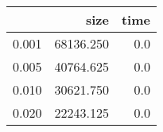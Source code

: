 \begin{table}[H]
\centering
\begin{tabular}{lrr}
\toprule
{} &       size &  time \\
\midrule
0.001 &  68136.250 &   0.0 \\
0.005 &  40764.625 &   0.0 \\
0.010 &  30621.750 &   0.0 \\
0.020 &  22243.125 &   0.0 \\
\bottomrule
\end{tabular}
\end{table}
